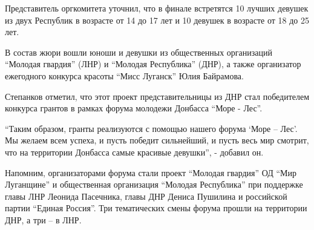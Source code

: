 Представитель оргкомитета уточнил, что в финале встретятся 10 лучших девушек из
двух Республик в возрасте от 14 до 17 лет и 10 девушек в возрасте от 18 до 25
лет.


В состав жюри вошли юноши и девушки из общественных организаций \enquote{Молодая
гвардия} (ЛНР) и \enquote{Молодая Республика} (ДНР), а также организатор ежегодного
конкурса красоты \enquote{Мисс Луганск} Юлия Байрамова.


Степанков отметил, что этот проект представительницы из ДНР стал победителем
конкурса грантов в рамках форума молодежи Донбасса \enquote{Море - Лес}.


\enquote{Таким образом, гранты реализуются с помощью нашего форума
\enquote{Море – Лес}. Мы желаем всем успеха, и пусть победит сильнейший, и
пусть весь мир смотрит, что на территории Донбасса самые красивые девушки}, -
добавил он.


Напомним, организаторами форума стали проект \enquote{Молодая гвардия} ОД \enquote{Мир
Луганщине} и общественная организация \enquote{Молодая Республика} при поддержке главы
ЛНР Леонида Пасечника, главы ДНР Дениса Пушилина и российской партии \enquote{Единая
Россия}. Три тематических смены форума прошли на территории ДНР, а три – в ЛНР. 

